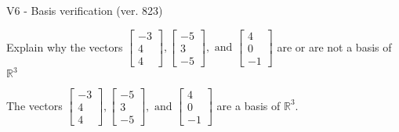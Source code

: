 \begin{exercise}
  \begin{exerciseTitle}V6 - Basis verification (ver. 823)\end{exerciseTitle}
  \begin{exerciseStatement}
    Explain why the vectors \(\left[\begin{array}{r}
-3 \\
4 \\
4
\end{array}\right] , \left[\begin{array}{r}
-5 \\
3 \\
-5
\end{array}\right] , \text{ and } \left[\begin{array}{r}
4 \\
0 \\
-1
\end{array}\right]\) are or are not a basis of \(\mathbb{R}^3\)	


  \end{exerciseStatement}
  \begin{exerciseAnswer}
   The vectors \(\left[\begin{array}{r}
-3 \\
4 \\
4
\end{array}\right] , \left[\begin{array}{r}
-5 \\
3 \\
-5
\end{array}\right] , \text{ and } \left[\begin{array}{r}
4 \\
0 \\
-1
\end{array}\right]\) 
  	 are  a basis of \(\mathbb{R}^3\).
  


  \end{exerciseAnswer}
\end{exercise}